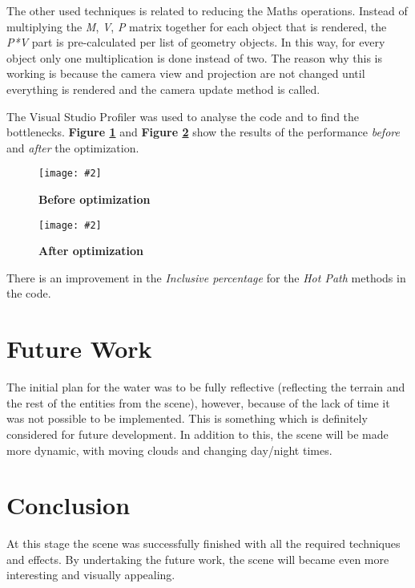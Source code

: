 \documentclass[10pt, a4paper]{article}
\newcommand{\figuremacro}[5]{
    \begin{figure}[#1]
        \centering
        \texttt{[image: \#2]}
        \caption[#3]{\textbf{#3}#4}
        \label{fig:#2}
    \end{figure}
}
\begin{document}
	The other used techniques is related to reducing the Maths operations. Instead of multiplying the \textit{M}, \textit{V}, \textit{P} matrix together for each object that is rendered, the \textit{P*V} part is pre-calculated per list of geometry objects. In this way, for every object only one multiplication is done instead of two. The reason why this is working is because the camera view and projection are not changed until everything is rendered and the camera update method is called.
	
	The Visual Studio Profiler was used to analyse the code and to find the bottlenecks. \textbf{Figure {\ref{fig:beforeOptimization}}} and \textbf{Figure {\ref{fig:afterOptimization}}} show the results of the performance \textit{before} and \textit{after} the optimization.
	
	\figuremacro{h}{beforeOptimization}{Before optimization}{ }{1.0}
	\figuremacro{h}{afterOptimization}{After optimization}{ }{1.0}
	
	There is an improvement in the \textit{Inclusive percentage} for the \textit{Hot Path} methods in the code.
	\section{Future Work}
	The initial plan for the water was to be fully reflective (reflecting the terrain and the rest of the entities from the scene), however, because of the lack of time it was not possible to be implemented. This is something which is definitely considered  for future development. In addition to this, the scene will be made more dynamic, with moving clouds and changing day/night times. 
	\section{Conclusion}
	At this stage the scene was successfully finished with all the required techniques and effects. By undertaking the future work, the scene will became even more interesting and visually appealing.	


		
\end{document}
